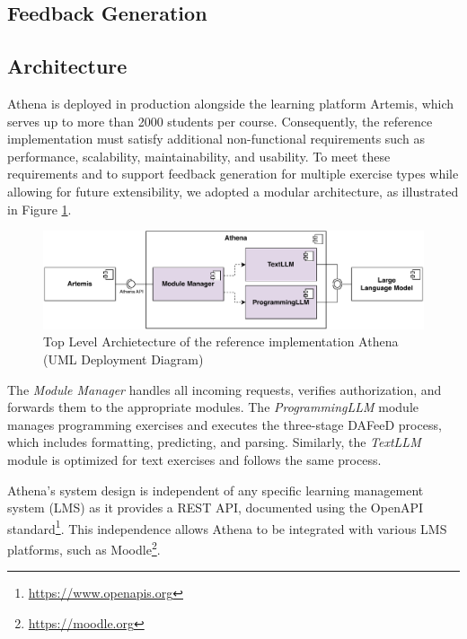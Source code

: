 \documentclass[manuscript,screen,review]{acmart}
\begin{document}
\subsection{Feedback Generation}

\subsection{Architecture}

Athena is deployed in production alongside the learning platform Artemis, which serves up to more than 2000 students per course.
Consequently, the reference implementation must satisfy additional non-functional requirements such as performance, scalability, maintainability, and usability.
To meet these requirements and to support feedback generation for multiple exercise types while allowing for future extensibility, we adopted a modular architecture, as illustrated in Figure \ref{fig:Athena-architecture}.

\begin{figure}[htbp]
  \centering
  \includegraphics[width=\linewidth]{figures/Athena-Architecture.pdf}
  \caption{Top Level Archietecture of the reference implementation Athena (UML Deployment Diagram)}
  \label{fig:Athena-architecture}
\end{figure}

The \textit{Module Manager} handles all incoming requests, verifies authorization, and forwards them to the appropriate modules.
The \textit{ProgrammingLLM} module manages programming exercises and executes the three-stage DAFeeD process, which includes formatting, predicting, and parsing. 
Similarly, the \textit{TextLLM} module is optimized for text exercises and follows the same process.

Athena's system design is independent of any specific learning management system (LMS) as it provides a REST API, documented using the OpenAPI standard\footnote{\url{https://www.openapis.org}}.
This independence allows Athena to be integrated with various LMS platforms, such as Moodle\footnote{\url{https://moodle.org}}.
\end{document}
